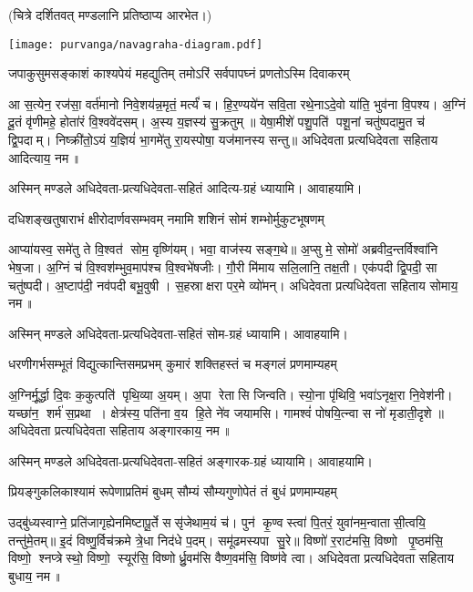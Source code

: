 
(चित्रे दर्शितवत् मण्डलानि प्रतिष्ठाप्य आरभेत।)

\texttt{[image: purvanga/navagraha-diagram.pdf]}

\twolineshloka
{जपाकुसुमसङ्काशं काश्यपेयं महद्युतिम्}
{तमोऽरिं सर्वपापघ्नं प्रणतोऽस्मि दिवाकरम्}

आ स॒त्येन॒ रज॑सा॒ वर्त॑मानो निवे॒शय॑न्न॒मृतं॒ मर्त्यं॑ च। हि॒र॒ण्यये॑न सवि॒ता रथे॒नाऽदे॒वो या॑ति॒
भुव॑ना वि॒पश्य\sn{}। अ॒ग्निं दू॒तं वृ॑णीमहे॒ होता॑रं वि॒श्ववे॑दसम्। अ॒स्य य॒ज्ञस्य॑ सु॒क्रतुम्॥
येषा॒मीशे॑ पशु॒पति॑ पशू॒नां चतु॑ष्पदामु॒त च॑ द्वि॒पदाम्। निष्क्री॑तो॒ऽयं य॒ज्ञियं॑ भा॒गमे॑तु
रा॒यस्पोषा॒ यज॑मानस्य सन्तु॥  अधिदेवता प्रत्यधिदेवता सहिताय आदित्याय॒ नम॥ 

अस्मिन् मण्डले अधिदेवता-प्रत्यधिदेवता-सहितं आदित्य-ग्रहं ध्यायामि। आवाहयामि।

\twolineshloka
{दधिशङ्खतुषाराभं क्षीरोदार्णवसम्भवम्}
{नमामि शशिनं सोमं शम्भोर्मुकुटभूषणम्}

आप्या॑यस्व॒ समे॑तु ते वि॒श्वत॑ सोम॒ वृष्णि॑यम्। भवा॒ वाज॑स्य सङ्ग॒थे॥ अ॒प्सु मे॒ सोमो॑
अब्रवीद॒न्तर्विश्वा॑नि भेष॒जा। अ॒ग्निं च॑ वि॒श्वश॑म्भुव॒माप॑श्च वि॒श्वभे॑षजीः। गौ॒री मि॑माय
सलि॒लानि॒ तक्ष॒ती। एक॑पदी द्वि॒पदी॒ सा चतु॑ष्पदी। अ॒ष्टाप॑दी॒ नव॑पदी बभू॒वुषी। स॒हस्राक्षरा पर॒मे
व्यो॑मन्।  अधिदेवता प्रत्यधिदेवता सहिताय सोमाय॒ नम॥ 

अस्मिन् मण्डले अधिदेवता-प्रत्यधिदेवता-सहितं सोम-ग्रहं ध्यायामि। आवाहयामि।


\twolineshloka
{धरणीगर्भसम्भूतं विद्युत्कान्तिसमप्रभम्}
{कुमारं शक्तिहस्तं च मङ्गलं प्रणमाम्यहम्}

अ॒ग्निर्मू॒र्द्धा दि॒वः क॒कुत्पति॑ पृथि॒व्या अ॒यम्। अ॒पा रेतासि जिन्वति। स्यो॒ना पृ॑थिवि॒
भवा॑ऽनृक्ष॒रा नि॒वेश॑नी। यच्छा॑न॒ शर्म॑ स॒प्रथा। क्षेत्र॑स्य॒ पति॑ना व॒य हि॒ते ने॑व जयामसि।
गामश्वं॑ पोषयि॒त्न्वा स नो॑ मृडाती॒दृशे॥  अधिदेवता प्रत्यधिदेवता सहिताय अङ्गारकाय॒ नम॥ 

अस्मिन् मण्डले अधिदेवता-प्रत्यधिदेवता-सहितं अङ्गारक-ग्रहं ध्यायामि। आवाहयामि।


\twolineshloka
{प्रियङ्गुकलिकाश्यामं रूपेणाप्रतिमं बुधम्}
{सौम्यं सौम्यगुणोपेतं तं बुधं प्रणमाम्यहम्}

उद्बु॑ध्यस्वाग्ने॒ प्रति॑जागृह्येनमिष्टापू॒र्ते ससृ॑जेथाम॒यं च॑। पुन॑ कृ॒ण्वस्त्वा॑ पि॒तरं॒
युवा॑नम॒न्वातासी॒त्वयि॒ तन्तु॑मे॒तम्॥ इ॒दं विष्णु॒र्विच॑क्रमे त्रे॒धा निद॑धे प॒दम्। समू॑ढमस्यपा
सु॒रे॥ विष्णो॑ र॒राट॑मसि॒ विष्णो पृ॒ष्ठम॑सि॒ विष्णो॒ श्नप्त्रेस्थो॒ विष्णो॒ स्यूर॑सि॒
विष्णोर्ध्रु॒वम॑सि वैष्ण॒वम॑सि॒ विष्ण॑वे त्वा।  अधिदेवता प्रत्यधिदेवता सहिताय बुधाय॒ नम॥ 

